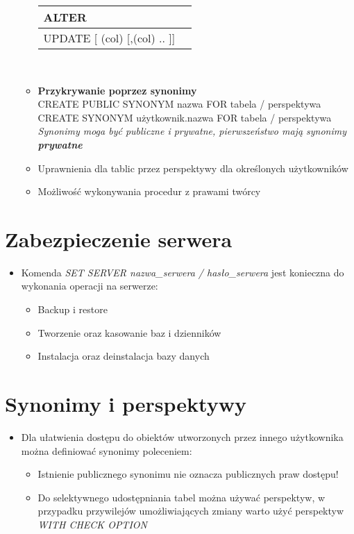 \documentclass[a4paper,twoside]{article}
\begin{document}
\begin{itemize}
\begin{itemize}
\begin{tabular}{|l|l|}
  				\hline ALTER\\
  				\hline UPDATE [ (col) [,(col) .. ]]\\
  				\hline
  			\end{tabular}\\
  			\item \textbf{Przykrywanie poprzez synonimy}\\
  			CREATE PUBLIC SYNONYM nazwa FOR tabela / perspektywa\\
  			CREATE SYNONYM użytkownik.nazwa FOR tabela / perspektywa\\
  			\emph{Synonimy moga być publiczne i prywatne, pierwszeństwo mają synonimy \textbf{prywatne}}
  			\item Uprawnienia dla tablic przez perspektywy dla określonych użytkowników
  			\item Możliwość wykonywania procedur z prawami twórcy
  		\end{itemize}
  	\end{itemize}
  	
  	\section*{Zabezpieczenie serwera}
  	\begin{itemize}
  		\item Komenda \emph{SET SERVER nazwa\_serwera / hasło\_serwera} jest konieczna do wykonania operacji na serwerze:
  		\begin{itemize}
  			\item Backup i restore 
  			\item Tworzenie oraz kasowanie baz i dzienników 
  			\item Instalacja oraz deinstalacja bazy danych
  		\end{itemize}
  	\end{itemize}
  	
  	\section*{Synonimy i perspektywy}
  	\begin{itemize}
  		\item Dla ułatwienia dostępu do obiektów utworzonych przez innego użytkownika można definiować synonimy poleceniem:
  		\begin{itemize}
  			\item Istnienie publicznego synonimu nie oznacza publicznych praw dostępu! 
  			\item Do selektywnego udostępniania tabel można używać perspektyw, w przypadku przywilejów umożliwiających zmiany warto użyć perspektyw \emph{WITH CHECK OPTION}
  		\end{itemize}
  	\end{itemize}
  	
\end{document}
